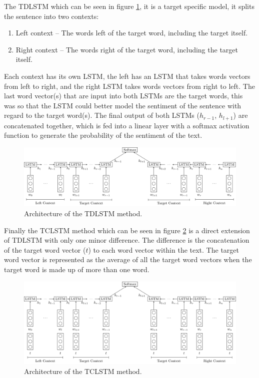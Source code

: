 The TDLSTM which can be seen in figure \ref{fig:repro_tdlstm_method}, it is a target specific model, it splits the sentence into two contexts:
\begin{enumerate}
    \item Left context -- The words left of the target word, including the target itself.
    \item Right context -- The words right of the target word, including the target itself.
\end{enumerate}
Each context has its own LSTM, the left has an LSTM that takes words vectors from left to right, and the right LSTM takes words vectors from right to left. The last word vector(s) that are input into both LSTMs are the target words, this was so that the LSTM could better model the sentiment of the sentence with regard to the target word(s). The final output of both LSTMs ($h_{r-1}$, $h_{l+1}$) are concatenated together, which is fed into a linear layer with a softmax activation function to generate the probability of the sentiment of the text.

\begin{figure}[!h]
    \centering
    \includegraphics[scale=0.55]{Diagrams/Reproducibility/tang_tdlstm.pdf}
    \caption{Architecture of the TDLSTM method.}
    \label{fig:repro_tdlstm_method}
\end{figure}

Finally the TCLSTM method which can be seen in figure \ref{fig:repro_tclstm_method} is a direct extension of TDLSTM with only one minor difference. The difference is the concatenation of the target word vector ($t$) to each word vector within the text. The target word vector is represented as the average of all the target word vectors when the target word is made up of more than one word.

\begin{figure}[!h]
    \centering
    \includegraphics[scale=0.55]{Diagrams/Reproducibility/tang_tclstm.pdf}
    \caption{Architecture of the TCLSTM method.}
    \label{fig:repro_tclstm_method}
\end{figure}

